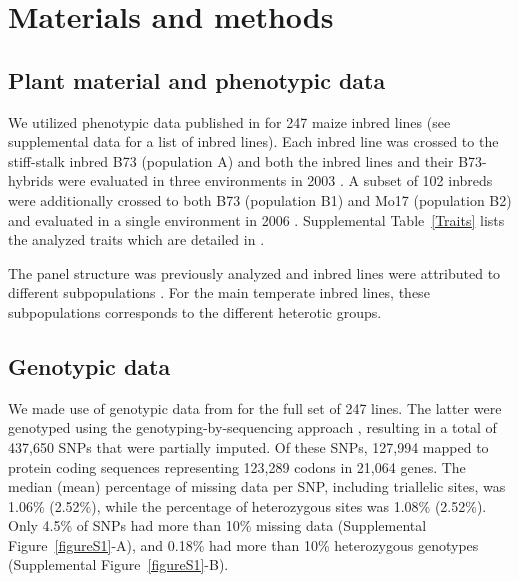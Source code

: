 \documentclass[12pt]{article}
\begin{document}
\section*{Materials and methods}
\subsection*{Plant material and phenotypic data}

We utilized phenotypic data published in \citet{Flint-Garcia2005} for 247 maize inbred lines (see supplemental data for a list of inbred lines). Each inbred line was crossed to the stiff-stalk inbred B73 (population A) and both the inbred lines and their B73-hybrids were evaluated in three environments in 2003 \citep{Flint-Garcia2009}. A subset of 102 inbreds were additionally crossed to both B73 (population B1) and Mo17 (population B2) and evaluated in a single environment in 2006 \citep{Flint-Garcia2009}. Supplemental Table~\ref{Traits} lists the analyzed traits which are detailed in \citet{Flint-Garcia2009}.

The panel structure was previously analyzed and inbred lines were attributed to different subpopulations \citep{Flint-Garcia2005}. For the main temperate inbred lines, these subpopulations corresponds to the different heterotic groups.%

\subsection*{Genotypic data}

We made use of genotypic data from \citet{Larsson2013} for the full set of 247 lines. The latter were genotyped using the genotyping-by-sequencing approach \citep[GBS;][]{Elshire2011}, resulting in a total of 437,650 SNPs that were partially imputed. Of these SNPs, 127,994 mapped to protein coding sequences representing 123,289 codons in 21,064 genes. The median (mean) percentage of missing data per SNP, including triallelic sites, was 1.06\% (2.52\%), while the percentage of heterozygous sites was 1.08\% (2.52\%). Only 4.5\% of SNPs had more than 10\% missing data (Supplemental Figure~\ref{figureS1}-A), and 0.18\% had more than 10\% heterozygous genotypes (Supplemental Figure~\ref{figureS1}-B).
\end{document}
